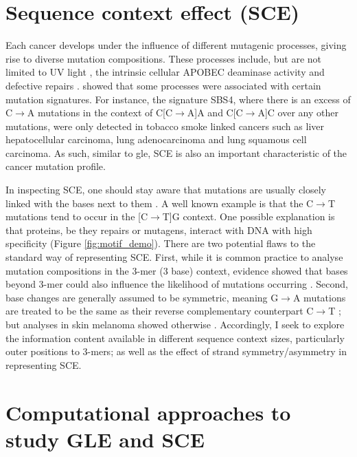\newpage
\section{Sequence context effect (SCE)}
\label{intro:sce}

Each cancer develops under the influence of different mutagenic processes, giving rise to diverse mutation compositions. These processes include, but are not limited to UV light \citep[known in skin melanoma;][]{Mohania2017}, the intrinsic cellular APOBEC deaminase activity \citep[\textit{e.g.} in B cells;][]{Kuppers2005MechanismsPathogenesis} and defective repairs \citep[\textit{e.g.} mutated \textit{BRCA} genes in breast cancer;][]{Navasardyan2021YY1TNBC}. \citet{Alexandrov2013, Alexandrov2020} showed that some processes were associated with certain mutation signatures. For instance, the signature SBS4, where there is an excess of C$\rightarrow$A mutations in the context of C[C$\rightarrow$A]A and C[C$\rightarrow$A]C over any other mutations, were only detected in tobacco smoke linked cancers such as liver hepatocellular carcinoma, lung adenocarcinoma and lung squamous cell carcinoma. As such, similar to \gls{gle}, SCE is also an important characteristic of the cancer mutation profile. 

In inspecting SCE, one should stay aware that mutations are usually closely linked with the \glspl{base} next to them \citep{Zhu2017}. A well known example is that the C$\rightarrow$T mutations tend to occur in the [C$\rightarrow$T]G context. One possible explanation is that proteins, be they repairs or mutagens, interact with DNA with high specificity (Figure \ref{fig:motif_demo}). There are two potential flaws to the standard way of representing SCE. First, while it is common practice to analyse mutation compositions in the 3-mer (3 base) context, evidence showed that bases beyond 3-mer could also influence the likelihood of mutations occurring \citep{Zhu2017,Zhu2020}. Second, base changes are generally assumed to be symmetric, meaning G$\rightarrow$A mutations are treated to be the same as their reverse complementary counterpart C$\rightarrow$T \citep{Alexandrov2013, Jiao2020}; but analyses in skin melanoma showed otherwise \citep{Zhu2017}. Accordingly, I seek to explore the information content available in different sequence context sizes, particularly outer positions to 3-mers; as well as the effect of strand symmetry/asymmetry in representing SCE.



\section{Computational approaches to study GLE and SCE}
\label{intro:ml}


